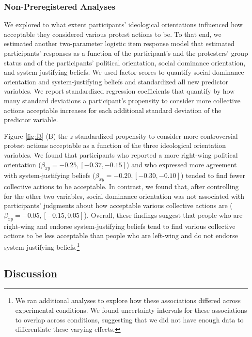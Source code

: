 \documentclass[12pt, letterpaper]{article}
\begin{document}
\hypertarget{non-preregistered-analyses}{%
\subsubsection{Non-Preregistered
Analyses}\label{non-preregistered-analyses}}

We explored to what extent participants' ideological orientations
influenced how acceptable they considered various protest actions to be.
To that end, we estimated another two-parameter logistic item response
model that estimated participants' responses as a function of the
participant's and the protesters' group status and of the participants'
political orientation, social dominance orientation, and
system-justifying beliefs. We used factor scores to quantify social
dominance orientation and system-justifying beliefs and standardized all
new predictor variables. We report standardized regression coefficients
that quantify by how many standard deviations a participant's propensity
to consider more collective actions acceptable increases for each
additional standard deviation of the predictor variable.

Figure \ref{fig:f3} (B) the \(z\)-standardized propensity to consider
more controversial protest actions acceptable as a function of the three
ideological orientation variables. We found that participants who
reported a more right-wing political orientation
(\(\beta_{xy} = -0.25, [-0.37, -0.15]\)) and who expressed more
agreement with system-justifying beliefs
(\(\beta_{xy} = -0.20, [-0.30, -0.10]\)) tended to find fewer collective
actions to be acceptable. In contrast, we found that, after controlling
for the other two variables, social dominance orientation was not
associated with participants' judgments about how acceptable various
collective actions are (\(\beta_{xy} = -0.05, [-0.15, 0.05]\)). Overall,
these findings suggest that people who are right-wing and endorse
system-justifying beliefs tend to find various collective actions to be
less acceptable than people who are left-wing and do not endorse
system-justifying beliefs.\footnote{We ran additional analyses to
  explore how these associations differed across experimental
  conditions. We found uncertainty intervals for these associations to
  overlap across conditions, suggesting that we did not have enough data
  to differentiate these varying effects.}

\hypertarget{discussion}{%
\subsection{Discussion}\label{discussion}}
\end{document}
